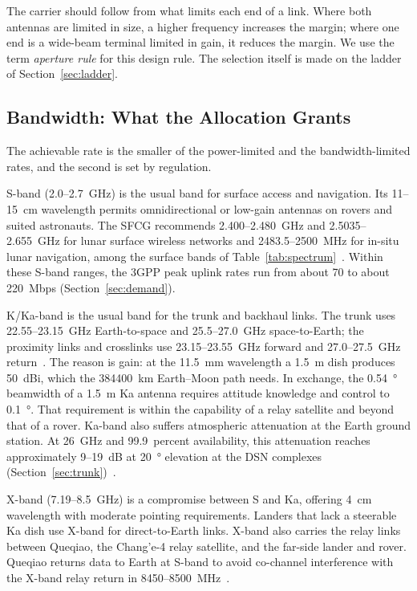 \documentclass{IEEEoj}
\begin{document}
\begin{remark}
\label{rem:freq}
The carrier should follow from what limits each end of a link. Where both antennas are limited in size, a higher frequency increases the margin; where one end is a wide-beam terminal limited in gain, it reduces the margin. We use the term \emph{aperture rule} for this design rule. The selection itself is made on the ladder of Section~\ref{sec:ladder}.
\end{remark}


\subsection{Bandwidth: What the Allocation Grants}
The achievable rate is the smaller of the power-limited and the bandwidth-limited rates, and the second is set by regulation.


S-band (\SI{2.0}{}--\SI{2.7}{GHz}) is the usual band for surface access and navigation. Its \SI{11}{}--\SI{15}{cm} wavelength permits omnidirectional or low-gain antennas on rovers and suited astronauts. The SFCG recommends \SI{2.400}{}--\SI{2.480}{GHz} and \SI{2.5035}{}--\SI{2.655}{GHz} for lunar surface wireless networks and \SI{2483.5}{}--\SI{2500}{MHz} for in-situ lunar navigation, among the surface bands of Table~\ref{tab:spectrum}~\cite{sfcg_rec32}. Within these S-band ranges, the 3GPP peak uplink rates run from about \SI{70}{} to about \SI{220}{Mbps} (Section~\ref{sec:demand}).

K/Ka-band is the usual band for the trunk and backhaul links. The trunk uses \SI{22.55}{}--\SI{23.15}{GHz} Earth-to-space and \SI{25.5}{}--\SI{27.0}{GHz} space-to-Earth; the proximity links and crosslinks use \SI{23.15}{}--\SI{23.55}{GHz} forward and \SI{27.0}{}--\SI{27.5}{GHz} return~\cite{sfcg_rec32,lnis_v5}. The reason is gain: at the \SI{11.5}{mm} wavelength a \SI{1.5}{m} dish produces \SI{50}{dBi}, which the \SI{384400}{km} Earth--Moon path needs. In exchange, the \SI{0.54}{\degree} beamwidth of a \SI{1.5}{m} Ka antenna requires attitude knowledge and control to \SI{0.1}{\degree}. That requirement is within the capability of a relay satellite and beyond that of a rover. Ka-band also suffers atmospheric attenuation at the Earth ground station. At \SI{26}{GHz} and 99.9~percent availability, this attenuation reaches approximately \SI{9}{}--\SI{19}{dB} at \SI{20}{\degree} elevation at the DSN complexes (Section~\ref{sec:trunk})~\cite{itu_p618,islam_ka_band}.

X-band (\SI{7.19}{}--\SI{8.5}{GHz}) is a compromise between S and Ka, offering \SI{4}{cm} wavelength with moderate pointing requirements. Landers that lack a steerable Ka dish use X-band for direct-to-Earth links. X-band also carries the relay links between Queqiao, the Chang'e-4 relay satellite, and the far-side lander and rover. Queqiao returns data to Earth at S-band to avoid co-channel interference with the X-band relay return in \SI{8450}{}--\SI{8500}{MHz}~\cite{chen_ce4_relay}.
\end{document}
